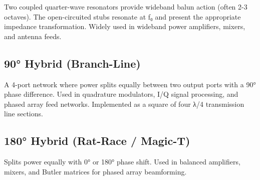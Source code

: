 				

Two coupled quarter-wave resonators provide wideband balun action (often 2-3 octaves). The open-circuited stubs resonate at f₀ and present the appropriate impedance transformation. Widely used in wideband power amplifiers, mixers, and antenna feeds.

				

\subsection{90° Hybrid (Branch-Line)}

				

A 4-port network where power splits equally between two output ports with a 90° phase difference. Used in quadrature modulators, I/Q signal processing, and phased array feed networks. Implemented as a square of four λ/4 transmission line sections.

				

\subsection{180° Hybrid (Rat-Race / Magic-T)}

				

Splits power equally with 0° or 180° phase shift. Used in balanced amplifiers, mixers, and Butler matrices for phased array beamforming.



